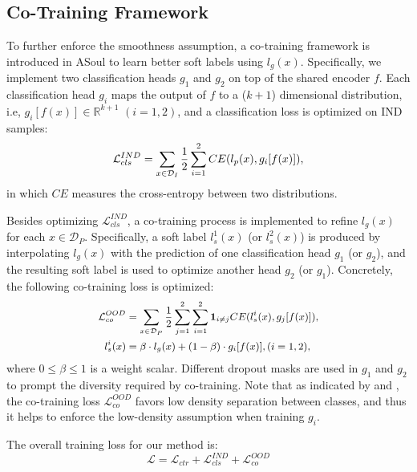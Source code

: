 \documentclass[11pt]{article}
\begin{document}
\subsection{Co-Training Framework}
To further enforce the smoothness assumption, a co-training framework is introduced in ASoul to learn better soft labels using $l_g(x)$. Specifically, we implement two classification heads $g_1$ and $g_2$ on top of the shared encoder $f$. Each classification head $g_i$ maps the output of $f$ to a ($k+1$) dimensional distribution, i.e, $g_i[f(x)] \in \mathbb{R}^{k+1}$ $(i=1, 2)$, and a classification loss is optimized on IND samples:
\begin{equation}\label{eq:cls_ind}
\small
\mathcal{L}_{cls}^{IND} = \sum_{x \in \mathcal{D}_{I}} \frac{1}{2} \sum_{i=1}^2 CE(l_p(x) , g_i[f(x)]),
\end{equation}
in which $CE$ measures the cross-entropy between two distributions.

Besides optimizing $\mathcal{L}_{cls}^{IND}$, a co-training process is implemented to refine $l_g(x)$ for each $x \in \mathcal{D}_P$. Specifically, a soft label $l_s^1(x)$ (or $l_s^2(x)$) is produced by interpolating $l_g(x)$ with the prediction of one classification head $g_1$ (or $g_2$), and the resulting soft label is used to optimize another head $g_2$ (or $g_1$). Concretely, the following co-training loss is optimized:
\begin{equation}\label{eq:co_ood}
\small
\begin{aligned}
\mathcal{L}_{co}^{OOD} &= \sum_{x \in \mathcal{D}_{P}} \frac{1}{2} \sum_{j=1}^2 \sum_{i=1}^{2} \mathbf{1}_{i \neq j} CE( l_s^i(x)  , g_j[f(x)]), \\
l_s^i(x) &= \beta \cdot l_g(x) + (1-\beta) \cdot g_i[f(x)], (i=1,2),
\end{aligned}
\end{equation}
where $0 \leq \beta \leq 1$ is a weight scalar. Different dropout masks are used in $g_1$ and $g_2$ to prompt the diversity required by co-training. Note that as indicated by \citet{lee2013pseudo} and \citet{chen2022semi}, the co-training loss $\mathcal{L}_{co}^{OOD}$ favors low density separation between classes, and thus it helps to enforce the low-density assumption when training $g_i$.

The overall training loss for our method is:
\begin{equation}\label{eq:total_loss}
\mathcal{L}=\mathcal{L}_{ctr} + \mathcal{L}_{cls}^{IND} + \mathcal{L}_{co}^{OOD}
\end{equation}
\end{document}
